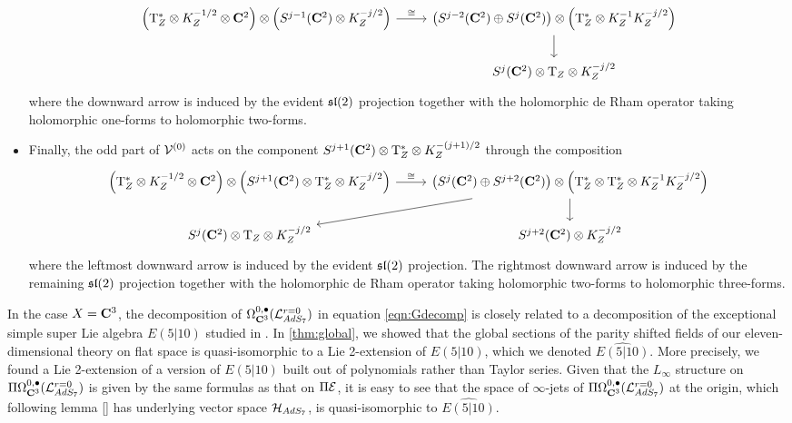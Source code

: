\documentclass[../main.tex]{subfiles}
\begin{document}
\begin{itemize}
\begin{equation}
\begin{tikzcd}
\left(\T^*_Z \otimes K^{-1/2}_Z \otimes \C^2\right) \otimes \left(S^{j-1}(\C^2) \otimes K^{-j/2}_Z\right) \ar[r,"\cong"] & \left(S^{j-2}(\C^2) \oplus S^{j}(\C^2)\right) \otimes \left(\T^*_Z \otimes K^{-1}_Z K^{-j/2}_Z\right) \ar[d] \\
& S^{j}(\C^2) \otimes \T_Z \otimes K^{-j/2}_Z
\end{tikzcd}
\end{equation}
where the downward arrow is induced by the evident $\mathfrak{sl}(2)$ projection together with the holomorphic de Rham operator taking holomorphic one-forms to holomorphic two-forms. 
\item Finally, the odd part of $\mathcal{V}^{(0)}$ acts on the component $S^{j+1}(\mathbf{C}^2) \otimes {\mathrm{T}}^*_Z \otimes K^{-(j+1)/2}_Z$ through the composition
\begin{equation}
\begin{tikzcd}
\left(\T^*_Z \otimes K^{-1/2}_Z \otimes \C^2\right) \otimes \left(S^{j+1}(\C^2) \otimes \T^*_Z \otimes K^{-j/2}_Z\right) \ar[r,"\cong"] & \left(S^{j}(\C^2) \oplus S^{j+2}(\C^2)\right) \otimes \left(\T^*_Z \otimes \T^*_Z \otimes K^{-1}_Z K^{-j/2}_Z\right) \ar[dl] \ar[d] \\
S^j (\C^2) \otimes \T_Z \otimes K_Z^{-j/2} & S^{j+2}(\C^2)  \otimes K^{-j/2}_Z
\end{tikzcd}
\end{equation}
where the leftmost downward arrow is induced by the evident $\mathfrak{sl}(2)$ projection.
The rightmost downward arrow is induced by the remaining $\mathfrak{sl}(2)$ projection together with the holomorphic de Rham operator taking holomorphic two-forms to holomorphic three-forms.
\end{itemize}
\fi

\parsec[s:kacrelation]

In the case $X = \mathbf{C}^3$, the decomposition of $\Omega^{0,\bullet}_{\mathbf{C}^3} (\mathcal{L}^{r=0}_{AdS_7} )$ in equation \eqref{eqn:Gdecomp} is closely related to a decomposition of the exceptional simple super Lie algebra $E(5|10)$ studied in \cite{KR2}. In \ref{thm:global}, we showed that the global sections of the parity shifted fields of our eleven-dimensional theory on flat space is quasi-isomorphic to a Lie 2-extension of $E(5|10)$, which we denoted $\widehat{E(5|10)}$. More precisely, we found a Lie 2-extension of a version of $E(5|10)$ built out of polynomials rather than Taylor series. Given that the $L_\infty$ structure on $\Pi \Omega^{0,\bullet}_{\mathbf{C}^3} (\mathcal{L}^{r=0}_{AdS_7} )$ is given by the same formulas as that on $\Pi \mathcal{E}$, it is easy to see that the space of $\infty$-jets of $\Pi \Omega^{0,\bullet}_{\mathbf{C}^3} (\mathcal{L}^{r=0}_{AdS_7} )$ at the origin, which following lemma \ref{} has underlying vector space $\mathcal{H}_{AdS_7}$, is quasi-isomorphic to $\widehat{E(5|10)}$. 
\end{document}
